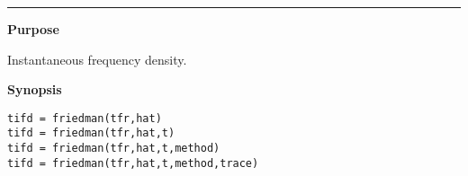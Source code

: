 


\hspace*{-1.6cm}{\Large \bf friedman}

\vspace*{-.4cm}
\hspace*{-1.6cm}\rule[0in]{16.5cm}{.02cm}
\vspace*{.2cm}



{\bf \large {}\selectfont Purpose}\\
\hspace*{1.5cm}
\begin{minipage}[t]{13.5cm}
Instantaneous frequency density.
\end{minipage}
\vspace*{.5cm}


{\bf \large {}\selectfont Synopsis}\\
\hspace*{1.5cm}
\begin{minipage}[t]{13.5cm}
\begin{verbatim}
tifd = friedman(tfr,hat)
tifd = friedman(tfr,hat,t)
tifd = friedman(tfr,hat,t,method)
tifd = friedman(tfr,hat,t,method,trace)
\end{verbatim}
\end{minipage}
\vspace*{.5cm}


